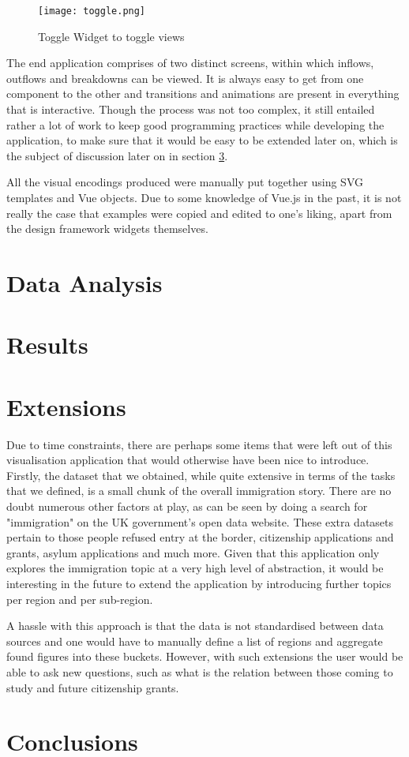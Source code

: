 \documentclass[11pt,a4paper,titlepage]{article}
\begin{document}
\begin{figure}[ht]
	\caption{Toggle Widget to toggle views}\label{fig_6}
	\centering
	\texttt{[image: toggle.png]}
\end{figure}

The end application comprises of two distinct screens, within which inflows, outflows and breakdowns can be viewed. It is always easy to get from one component to the other and transitions and animations are present in everything that is interactive. Though the process was not too complex, it still entailed rather a lot of work to keep good programming practices while developing the application, to make sure that it would be easy to be extended later on, which is the subject of discussion later on in section \ref{extensions}.

All the visual encodings produced were manually put together using SVG templates and Vue objects. Due to some knowledge of Vue.js in the past, it is not really the case that examples were copied and edited to one's liking, apart from the design framework widgets themselves.

\section{Data Analysis}

\section{Results}

\section{Extensions}\label{extensions}
Due to time constraints, there are perhaps some items that were left out of this visualisation application that would otherwise have been nice to introduce. Firstly, the dataset that we obtained, while quite extensive in terms of the tasks that we defined, is a small chunk of the overall immigration story. There are no doubt numerous other factors at play, as can be seen by doing a search for "immigration" on the UK government's open data website. These extra datasets pertain to those people refused entry at the border, citizenship applications and grants, asylum applications and much more. Given that this application only explores the immigration topic at a very high level of abstraction, it would be interesting in the future to extend the application by introducing further topics per region and per sub-region.

A hassle with this approach is that the data is not standardised between data sources and one would have to manually define a list of regions and aggregate found figures into these buckets. However, with such extensions the user would be able to ask new questions, such as what is the relation between those coming to study and future citizenship grants. 

\section{Conclusions}


 
\end{document}
